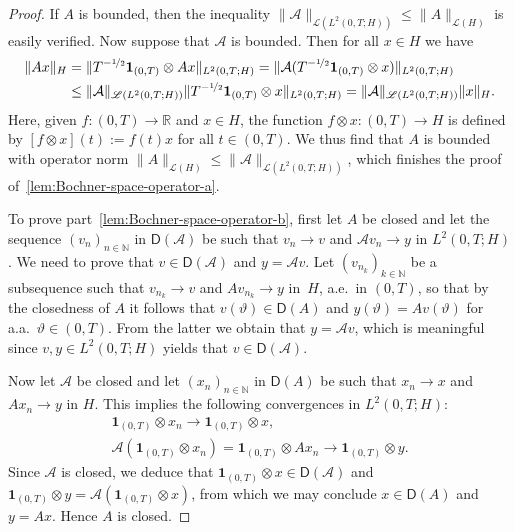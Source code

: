 \documentclass[reqno]{amsart}
\numberwithin{equation}{section}
\newcommand{\R}{\mathbb{R}}
\newcommand{\N}{\mathbb{N}}
\newcommand{\norm}[2]{     \| #1       \|_{ #2 }}
\newcommand{\from}{\colon}
\theoremstyle{remark}
\theoremstyle{definition}
\begin{document}
\begin{proof}
	If $A$ is bounded, 
	then the inequality 
	$\norm{\mathcal A}{\mathscr L(L^2(0,T;H))} 
	\leq 
	\norm{A}{\mathscr L(H)}$ 
	is easily verified.
	Now suppose that $\mathcal A$ is bounded. 
	Then for all $x \in H$ we have
	\begin{align*}
	\norm{Ax}{H} 
	&= 
	\norm{T^{-\nicefrac{1}{2}}\mathbf 1_{(0,T)} \otimes Ax}{L^2(0,T;H)} 
	= 
	\norm{\mathcal A(T^{-\nicefrac{1}{2}}\mathbf 1_{(0,T)} \otimes x)}{L^2(0,T;H)} 
	\\
	&\leq 
	\norm{\mathcal A}{\mathscr L(L^2(0,T;H))} 
	\norm{T^{-\nicefrac{1}{2}}\mathbf 1_{(0,T)} \otimes x}{L^2(0,T;H)} 
	= \norm{\mathcal A}{\mathscr L(L^2(0,T;H))} \norm{x}{H}.
	\end{align*} 
	Here, given $f \from (0,T)\to \R$ and $x \in H$,
	the function $f \otimes x \from (0,T)\to H$ is 
	defined by $[f\otimes x](t) := f(t)x$ for all $t \in (0,T)$.
	We thus find that $A$ is bounded 
	with operator norm  
	$\norm{A}{\mathscr L(H)}
	\leq \norm{\mathcal A}{\mathscr L(L^2(0,T;H))}$,
	which finishes the proof of~\ref{lem:Bochner-space-operator-a}. 
	
	To prove 
	part~\ref{lem:Bochner-space-operator-b}, 
	first let $A$ be closed and let the sequence 
	$(v_n)_{n\in\N}$ in $ \mathsf D(\mathcal A)$ 
	be such that $v_n \to v$ and $\mathcal Av_n \to y$ 
	in $L^2(0,T;H)$. We need to prove that 
	$v \in \mathsf D(\mathcal A)$ and 
	$y = \mathcal Av$. Let $(v_{n_k})_{k\in\N}$ 
	be a subsequence such that 
	$v_{n_k} \to v$ 
	and $Av_{n_k} \to y$ in~$H$, 
	a.e.\ in $(0,T)$, 
	so that by the closedness of $A$ it follows that 
	$v(\vartheta) \in \mathsf D(A)$ and $y(\vartheta) = Av(\vartheta)$ 
	for a.a.\ $\vartheta\in(0,T)$. 
	From the latter we obtain that $y = \mathcal Av$, 
	which is meaningful since $v,y\in L^2(0,T;H)$ 
	yields that $v \in \mathsf D(\mathcal A)$.
	
	Now let $\mathcal A$ be closed and 
	let $(x_n)_{n\in \N}$ in $\mathsf D(A)$ 
	be such that $x_n \to x$ and $Ax_n \to y$ in $H$. 
	This implies the following convergences in 
	$L^2(0,T;H)$: 
	\begin{align*}
	\mathbf 1_{(0,T)} \otimes x_n 
	\to \mathbf 1_{(0,T)}\otimes x, 
	\\ 
	\mathcal A(\mathbf 1_{(0,T)} \otimes x_n) 
	= 
	\mathbf 1_{(0,T)} \otimes Ax_n  
	\to \mathbf 1_{(0,T)} \otimes y. 
	\end{align*}
	Since $\mathcal A$ is closed, 
	we deduce that 
	$\mathbf 1_{(0,T)} \otimes x \in \mathsf D(\mathcal A)$ 
	and $\mathbf 1_{(0,T)} \otimes y = \mathcal A(\mathbf 1_{(0,T)} \otimes x)$, 
	from which we may conclude $x \in \mathsf D(A)$ and $y = Ax$. 
	Hence $A$ is closed.
\end{proof}
\end{document}
